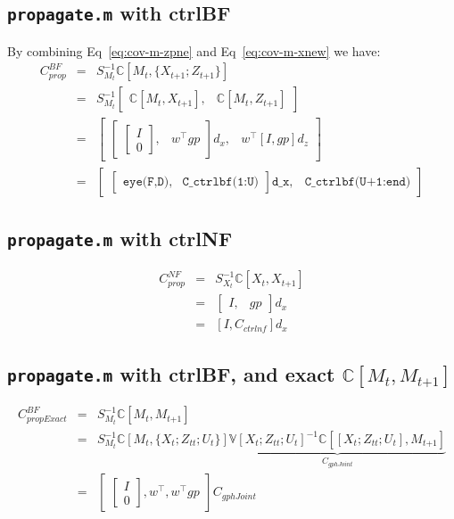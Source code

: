 \documentclass[9pt]{article}
\newcommand{\V}{{\mathbb V}}
\newcommand{\Cov}{{\mathbb C}}
\newcommand{\now}[1]{#1_t}                  %
\newcommand{\new}[1]{#1_{t\mathord{+}1}}    %
\newcommand{\uno}[1]{#1_{tt}}              %
\newcommand{\pne}[1]{#1_{t\mathord{+}1}}   %
\newcommand{\inv}{^{-1}}
\newcommand{\nnn}{\nonumber \\}
\newcommand{\nn}{\nonumber}
\begin{document}
\subsection{\texttt{propagate.m} with ctrlBF}

By combining Eq~\ref{eq:cov-m-zpne} and Eq~\ref{eq:cov-m-xnew} we have:
\begin{eqnarray}
C^{BF}_{prop}
&=& S_{\now{M}}\inv \Cov[\now{M}, \{\new{X} ; \pne{Z}\}] \nnn
&=& S_{\now{M}}\inv \begin{bmatrix} \Cov[\now{M}, \new{X}], & \Cov[\now{M}, \pne{Z}] \end{bmatrix} \nnn
&=& \begin{bmatrix} \begin{bmatrix} \begin{bmatrix} I \\ 0 \end{bmatrix}, & w^\top gp \end{bmatrix} d_x, & w^\top [ I , gp ] d_z \end{bmatrix} \nnn
&=& \begin{bmatrix} \begin{bmatrix} \texttt{eye(F,D)}, & \texttt{C\_ctrlbf(1:U)} \end{bmatrix} \texttt{d\_x},
    & \texttt{C\_ctrlbf(U+1:end)} \end{bmatrix} \nn
\end{eqnarray}


\subsection{\texttt{propagate.m} with ctrlNF}

\begin{eqnarray}
C^{NF}_{prop}
&=& S_{\now{X}}\inv \Cov[\now{X}, \new{X}] \nnn
&=& \begin{bmatrix} I, & gp \end{bmatrix} d_x \nnn
&=& [I, C_{ctrlnf}] d_x \nn
\end{eqnarray}

\subsection{\texttt{propagate.m} with ctrlBF, and exact $\Cov[\now{M}, \new{M}]$}

\begin{eqnarray}
C^{BF}_{propExact}
 &=& S_{\now{M}}\inv \Cov[\now{M}, \new{M}] \nnn
 &=& S_{\now{M}}\inv \Cov[\now{M}, \{\now{X} ; \uno{Z} ; \now{U}\}] \underbrace{\V[\now{X};\uno{Z};\now{U}]\inv \Cov[[\now{X};\uno{Z};\now{U}], \new{M}]}_{C_{gphJoint}} \nnn
 &=& \begin{bmatrix} \begin{bmatrix} I \\ 0 \end{bmatrix}, w^\top, w^\top gp \end{bmatrix} C_{gphJoint} \nn
\end{eqnarray}
\end{document}
